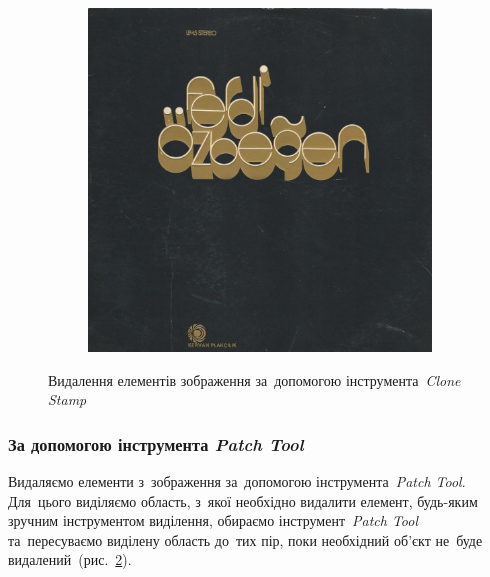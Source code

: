 \documentclass[
	a4paper,
	oneside,
	BCOR = 10mm,
	DIV = 12,
	12pt,
	headings = normal,
]{scrartcl}
\begin{document}
\begin{figure}[!htbp]
\begin{subfigure}{0.5\textwidth}
						\includegraphics[height = 6\baselineskip]{./../01-solution/y03s01-multimedia-lab-02-01-p01-clone-stamp.jpg}
						\caption{}
						\label{subfig:01-02-res}
					\end{subfigure}
					\caption{Видалення елементів зображення за~допомогою інструмента~\emph{\textenglish{Clone Stamp}}}
					\label{fig:01-removal-clone-stamp}
				\end{figure}

			\subsubsection{За допомогою інструмента \emph{\textenglish{Patch Tool}}}
				Видаляємо елементи з~зображення за~допомогою інструмента~\emph{\textenglish{Patch Tool}}. Для~цього виділяємо область, з~якої необхідно видалити елемент, будь-яким зручним інструментом виділення, обираємо інструмент~\emph{\textenglish{Patch Tool}} та~пересуваємо виділену область до~тих пір, поки необхідний об'єкт не~буде видалений~(рис.~\ref{fig:01-removal-clone-stamp}).
\end{document}
